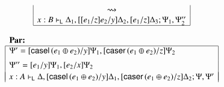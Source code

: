 \documentclass{lmcs}
\newcommand{\DualLNLLogicnt}[1]{\mathit{#1}}
\newcommand{\DualLNLLogicmv}[1]{\mathit{#1}}
\newcommand{\DualLNLLogicsym}[1]{#1}
\begin{document}
\begin{figure}
\begin{mdframed}
\begin{center}
\begin{math}
\begin{array}{c}
\begin{array}{|c|}
          \rightsquigarrow\\
           \DualLNLLogicmv{x}  :  \DualLNLLogicnt{B}  \vdash_{\mathsf{L} }  \Delta_{{\mathrm{1}}}  \DualLNLLogicsym{,}  \DualLNLLogicsym{[}  \DualLNLLogicsym{[}  \DualLNLLogicnt{e_{{\mathrm{1}}}}  \DualLNLLogicsym{/}  \DualLNLLogicmv{z}  \DualLNLLogicsym{]}  \DualLNLLogicnt{e_{{\mathrm{2}}}}  \DualLNLLogicsym{/}  \DualLNLLogicmv{y}  \DualLNLLogicsym{]}  \Delta_{{\mathrm{2}}}  \DualLNLLogicsym{,}  \DualLNLLogicsym{[}  \DualLNLLogicnt{e_{{\mathrm{1}}}}  \DualLNLLogicsym{/}  \DualLNLLogicmv{z}  \DualLNLLogicsym{]}  \Delta_{{\mathrm{3}}} ; \Psi_{{\mathrm{1}}}  \DualLNLLogicsym{,}  \Psi''_{{\mathrm{2}}} \\
          \hline
        \end{array}\\
        \\
        \begin{array}{|c|}
          \multicolumn{1}{l}{\textbf{Par:}}\\
          \hline
          \multicolumn{1}{|l|}{\Psi' = \DualLNLLogicsym{[}   \mathsf{casel}\, \DualLNLLogicsym{(}   \DualLNLLogicnt{e_{{\mathrm{1}}}}  \oplus  \DualLNLLogicnt{e_{{\mathrm{2}}}}   \DualLNLLogicsym{)}   \DualLNLLogicsym{/}  \DualLNLLogicmv{y}  \DualLNLLogicsym{]}  \Psi_{{\mathrm{1}}}  \DualLNLLogicsym{,}  \DualLNLLogicsym{[}   \mathsf{caser}\, \DualLNLLogicsym{(}   \DualLNLLogicnt{e_{{\mathrm{1}}}}  \oplus  \DualLNLLogicnt{e_{{\mathrm{2}}}}   \DualLNLLogicsym{)}   \DualLNLLogicsym{/}  \DualLNLLogicmv{z}  \DualLNLLogicsym{]}  \Psi_{{\mathrm{2}}}}\\[5px]
          \multicolumn{1}{|l|}{\Psi'' = \DualLNLLogicsym{[}  \DualLNLLogicnt{e_{{\mathrm{1}}}}  \DualLNLLogicsym{/}  \DualLNLLogicmv{y}  \DualLNLLogicsym{]}  \Psi_{{\mathrm{1}}}  \DualLNLLogicsym{,}  \DualLNLLogicsym{[}  \DualLNLLogicnt{e_{{\mathrm{2}}}}  \DualLNLLogicsym{/}  \DualLNLLogicmv{x}  \DualLNLLogicsym{]}  \Psi_{{\mathrm{2}}}}\\
          \\[-10px]
           \DualLNLLogicmv{x}  :  \DualLNLLogicnt{A}  \vdash_{\mathsf{L} }  \Delta  \DualLNLLogicsym{,}  \DualLNLLogicsym{[}   \mathsf{casel}\, \DualLNLLogicsym{(}   \DualLNLLogicnt{e_{{\mathrm{1}}}}  \oplus  \DualLNLLogicnt{e_{{\mathrm{2}}}}   \DualLNLLogicsym{)}   \DualLNLLogicsym{/}  \DualLNLLogicmv{y}  \DualLNLLogicsym{]}  \Delta_{{\mathrm{1}}}  \DualLNLLogicsym{,}  \DualLNLLogicsym{[}   \mathsf{caser}\, \DualLNLLogicsym{(}   \DualLNLLogicnt{e_{{\mathrm{1}}}}  \oplus  \DualLNLLogicnt{e_{{\mathrm{2}}}}   \DualLNLLogicsym{)}   \DualLNLLogicsym{/}  \DualLNLLogicmv{z}  \DualLNLLogicsym{]}  \Delta_{{\mathrm{2}}} ; \Psi  \DualLNLLogicsym{,}  \Psi' \\

\end{array}
\end{array}
\end{math}
\end{center}
\end{mdframed}
\end{figure}
\end{document}
